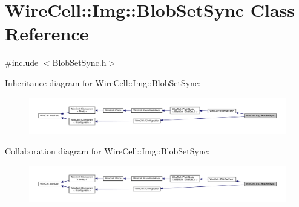 \hypertarget{class_wire_cell_1_1_img_1_1_blob_set_sync}{}\section{Wire\+Cell\+:\+:Img\+:\+:Blob\+Set\+Sync Class Reference}
\label{class_wire_cell_1_1_img_1_1_blob_set_sync}


{\ttfamily \#include $<$Blob\+Set\+Sync.\+h$>$}



Inheritance diagram for Wire\+Cell\+:\+:Img\+:\+:Blob\+Set\+Sync\+:
\nopagebreak
\begin{figure}[H]
\begin{center}
\leavevmode
\includegraphics[width=350pt]{class_wire_cell_1_1_img_1_1_blob_set_sync__inherit__graph}
\end{center}
\end{figure}


Collaboration diagram for Wire\+Cell\+:\+:Img\+:\+:Blob\+Set\+Sync\+:
\nopagebreak
\begin{figure}[H]
\begin{center}
\leavevmode
\includegraphics[width=350pt]{class_wire_cell_1_1_img_1_1_blob_set_sync__coll__graph}
\end{center}
\end{figure}

